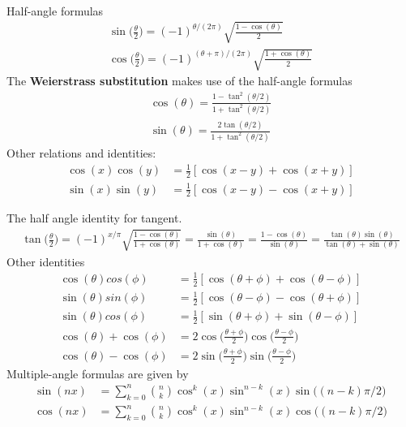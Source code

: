 \begin{multicols}{2}
\begin{align}
\end{align}
Half-angle formulas
\begin{align}
\sin\bigg(\frac{\theta}{2}\bigg)=(-1)^{\theta/(2\pi)}\sqrt{\frac{1-\cos(\theta)}{2}} \\
\cos\bigg(\frac{\theta}{2}\bigg)=(-1)^{(\theta+\pi)/(2\pi)}\sqrt{\frac{1+\cos(\theta)}{2}}
\end{align}
The \textbf{Weierstrass substitution} makes use of the half-angle formulas 
\begin{align}
\cos(\theta)=\frac{1-\tan^2(\theta/2)}{1+\tan^2(\theta/2)} \\
\sin(\theta)=\frac{2\tan(\theta/2)}{1+\tan^2(\theta/2)}
\end{align}
Other relations and identities:
\begin{align}
	\cos(x)\cos(y) &= \frac{1}{2}[\cos(x-y)+\cos(x+y)] \\
	\sin(x)\sin(y) &= \frac{1}{2}[\cos(x-y)-\cos(x+y)]
\end{align}
\end{multicols}
The half angle identity for tangent.
\begin{align}
\tan\bigg(\frac{\theta}{2}\bigg)=(-1)^{x/\pi}\sqrt{\frac{1-\cos(\theta)}{1+\cos(\theta)}} = \frac{\sin(\theta)}{1+\cos(\theta)}=\frac{1-\cos(\theta)}{\sin(\theta)}=\frac{\tan(\theta)\sin(\theta)}{\tan(\theta)+\sin(\theta)}
\end{align}
Other identities
\begin{align}
\cos(\theta)cos(\phi) &=\frac{1}{2}[\cos(\theta+\phi)+\cos(\theta-\phi)] \\
\sin(\theta)sin(\phi) &=\frac{1}{2}[\cos(\theta-\phi)-\cos(\theta+\phi)] \\
\sin(\theta)cos(\phi) &=\frac{1}{2}[\sin(\theta+\phi)+\sin(\theta-\phi)] \\
\cos(\theta)+\cos(\phi)&= 2\cos\bigg( \frac{\theta+\phi}{2}\bigg)\cos\bigg( \frac{\theta-\phi}{2}\bigg) \\
\cos(\theta)-\cos(\phi)&= 2\sin\bigg( \frac{\theta+\phi}{2}\bigg)\sin\bigg( \frac{\theta-\phi}{2}\bigg)
\end{align}
Multiple-angle formulas are given by 
\begin{align}
\sin(nx)&= \sum_{k=0}^{n}{{n}\choose{k}}\cos^k(x)\sin^{n-k}(x)\sin\big((n-k)\pi/2 \big) \\
\cos(nx)&= \sum_{k=0}^{n}{{n}\choose{k}}\cos^k(x)\sin^{n-k}(x)\cos\big((n-k)\pi/2 \big)
\end{align}








